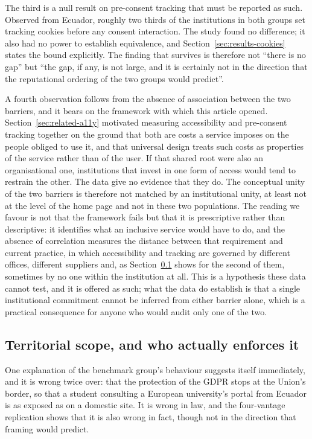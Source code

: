 \documentclass[]{interact}
\begin{document}
The third is a null result on pre-consent tracking that must be reported as such. Observed from Ecuador, roughly two thirds of the institutions in both groups set tracking cookies before any consent interaction. The study found no difference; it also had no power to establish equivalence, and Section~\ref{sec:results-cookies} states the bound explicitly. The finding that survives is therefore not ``there is no gap'' but ``the gap, if any, is not large, and it is certainly not in the direction that the reputational ordering of the two groups would predict''.

A fourth observation follows from the absence of association between the two barriers, and it bears on the framework with which this article opened. Section~\ref{sec:related-a11y} motivated measuring accessibility and pre-consent tracking together on the ground that both are costs a service imposes on the people obliged to use it, and that universal design treats such costs as properties of the service rather than of the user. If that shared root were also an organisational one, institutions that invest in one form of access would tend to restrain the other. The data give no evidence that they do. The conceptual unity of the two barriers is therefore not matched by an institutional unity, at least not at the level of the home page and not in these two populations. The reading we favour is not that the framework fails but that it is prescriptive rather than descriptive: it identifies what an inclusive service would have to do, and the absence of correlation measures the distance between that requirement and current practice, in which accessibility and tracking are governed by different offices, different suppliers and, as Section~\ref{sec:discussion-legal} shows for the second of them, sometimes by no one within the institution at all. This is a hypothesis these data cannot test, and it is offered as such; what the data do establish is that a single institutional commitment cannot be inferred from either barrier alone, which is a practical consequence for anyone who would audit only one of the two.

\subsection{Territorial scope, and who actually enforces it}\label{sec:discussion-legal}

One explanation of the benchmark group's behaviour suggests itself immediately, and it is wrong twice over: that the protection of the GDPR stops at the Union's border, so that a student consulting a European university's portal from Ecuador is as exposed as on a domestic site. It is wrong in law, and the four-vantage replication shows that it is also wrong in fact, though not in the direction that framing would predict.
\end{document}
